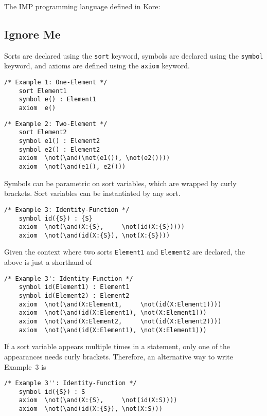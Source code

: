 \documentclass[UTF8,11pt]{article}
\theoremstyle{plain}
\theoremstyle{definition}
\theoremstyle{remark}
\begin{document}
The IMP programming language defined in Kore:


\subsection{Ignore Me}

\newcommand{\smalltt}[1]{\texttt{\small #1} }
\newcommand{\sort}{\smalltt{sort}}
\newcommand{\symb}{\smalltt{symbol}}
\newcommand{\axiom}{\smalltt{axiom}}

Sorts are declared using the \sort keyword, symbols are declared using the \symb keyword, and axioms are defined using the \axiom keyword.

\begin{Verbatim}[fontsize=\small]
    /* Example 1: One-Element */
    sort Element1
    symbol e() : Element1
    axiom  e()
\end{Verbatim}

\begin{Verbatim}[fontsize=\small]
    /* Example 2: Two-Element */
    sort Element2
    symbol e1() : Element2
    symbol e2() : Element2
    axiom  \not(\and(\not(e1()), \not(e2())))
    axiom  \not(\and(e1(), e2()))
\end{Verbatim}

Symbols can be parametric on sort variables, which are wrapped by curly brackets. 
Sort variables can be instantiated by any sort.

\begin{Verbatim}[fontsize=\small]
    /* Example 3: Identity-Function */
    symbol id({S}) : {S}
    axiom  \not(\and(X:{S},     \not(id(X:{S}))))
    axiom  \not(\and(id(X:{S}), \not(X:{S})))
\end{Verbatim}

Given the context where two sorts \smalltt{Element1} and \smalltt{Element2} are declared, the above is just a shorthand of

\begin{Verbatim}[fontsize=\small]
    /* Example 3': Identity-Function */
    symbol id(Element1) : Element1
    symbol id(Element2) : Element2
    axiom  \not(\and(X:Element1,     \not(id(X:Element1))))
    axiom  \not(\and(id(X:Element1), \not(X:Element1)))
    axiom  \not(\and(X:Element2,     \not(id(X:Element2))))
    axiom  \not(\and(id(X:Element1), \not(X:Element1)))
\end{Verbatim}

If a sort variable appears multiple times in a statement, only one of the appearances needs curly brackets.
Therefore, an alternative way to write Example~3 is
\begin{Verbatim}[fontsize=\small]
    /* Example 3'': Identity-Function */
    symbol id({S}) : S
    axiom  \not(\and(X:{S},     \not(id(X:S))))
    axiom  \not(\and(id(X:{S}), \not(X:S)))
\end{Verbatim}
\end{document}
